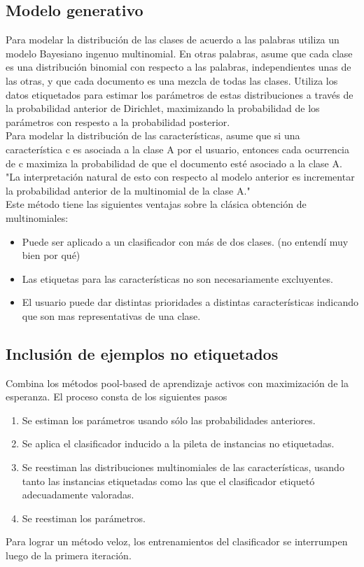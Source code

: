 \documentclass[11pt,spanish]{article}
\begin{document}
\subsection{Modelo generativo}
Para modelar la distribución de las clases de acuerdo a las palabras utiliza un
modelo Bayesiano ingenuo multinomial. En otras palabras, asume que cada clase
es una distribución binomial con respecto a las palabras, independientes unas
de las otras, y que cada documento es una mezcla de todas las clases. Utiliza
los datos etiquetados para estimar los parámetros de estas distribuciones a
través de la probabilidad anterior de Dirichlet, maximizando la probabilidad de
los parámetros con respesto a la probabilidad posterior.\\
Para modelar la distribución de las características, asume que si una
característica c es asociada a la clase A por el usuario, entonces cada
ocurrencia de c maximiza la probabilidad de que el documento esté asociado a la
clase A. "La interpretación natural de esto con respecto al modelo anterior es
incrementar la probabilidad anterior de la multinomial de la clase A."\\
Este método tiene las siguientes ventajas sobre la clásica obtención de
multinomiales:
\begin{itemize}
    \item Puede ser aplicado a un clasificador con más de dos clases. (no
    entendí muy bien por qué)
    \item Las etiquetas para las características no son necesariamente
    excluyentes.
    \item El usuario puede dar distintas prioridades a distintas características
    indicando que son mas representativas de una clase.
\end{itemize}

\subsection{Inclusión de ejemplos no etiquetados}
Combina los métodos pool-based de aprendizaje activos con maximización de la
esperanza. El proceso consta de los siguientes pasos
\begin{enumerate}
    \item Se estiman los parámetros usando sólo las probabilidades anteriores.
    \item Se aplica el clasificador inducido a la pileta de instancias no
    etiquetadas.
    \item Se reestiman las distribuciones multinomiales de las características,
    usando tanto las instancias etiquetadas como las que el clasificador
    etiquetó adecuadamente valoradas.
    \item Se reestiman los parámetros.
\end{enumerate}
Para lograr un método veloz, los entrenamientos del clasificador se interrumpen
luego de la primera iteración.
\end{document}
